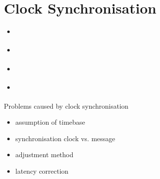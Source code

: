 \documentclass{beamer}
\begin{document}
\section{Clock Synchronisation}
\begin{frame}{}%
\begin{center}
\begin{itemize}
  \item \begin{large}\end{large}
 \item \begin{large}\end{large}
 \item \begin{large}\end{large}
 \item \begin{large}\end{large}
\end{itemize}
\end{center}
\end{frame}


\begin{frame}{Problems caused by clock synchronisation}%
\begin{center}
\begin{itemize}
  \item \begin{large}assumption of timebase\end{large}
 \item \begin{large}synchronisation clock vs. message\end{large}
 \item \begin{large}adjustment method\end{large}
 \item \begin{large}latency correction\end{large}
\end{itemize}
\end{center}
\end{frame}
\end{document}

